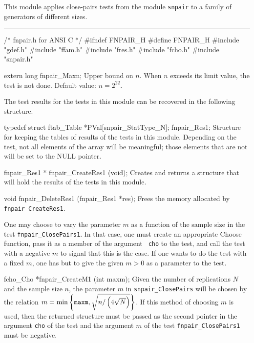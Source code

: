 
This module applies close-pairs tests from the module {\tt snpair}
to a family of generators of different sizes.

\bigskip
\hrule
\code\hide
/* fnpair.h  for ANSI C */
#ifndef FNPAIR_H
#define FNPAIR_H
\endhide
#include "gdef.h"
#include "ffam.h"
#include "fres.h"
#include "fcho.h"
#include "snpair.h"


extern long fnpair_Maxn;
\endcode
\tab
  Upper bound on $n$.
  When $n$ exceeds its limit value, the test is not done.
  Default value: $n = 2^{22}$.
\endtab
\ifdetailed  %



The test results for the tests in this module can be recovered
in the following structure.

\code

typedef struct {
   ftab_Table *PVal[snpair_StatType_N];
} fnpair_Res1;
\endcode
 \tab
  Structure for keeping the tables of results of the tests in
  this module. Depending on the test, not all elements of the array
  will be meaningful; those elements that are not will be set to
  the NULL pointer.
 \endtab
\code


fnpair_Res1 * fnpair_CreateRes1 (void);
\endcode
 \tab
  Creates and returns a structure that will hold the results
  of the tests in this module.
 \endtab
\code


void fnpair_DeleteRes1 (fnpair_Res1 *res);
\endcode
 \tab
  Frees the memory allocated by {\tt fnpair\_CreateRes1}.
 \endtab

\fi    %



 One may choose to vary the parameter $m$ as a function of the sample size
in the test {\tt fnpair\_ClosePairs1}. In that case, one must create
 an appropriate Choose function, pass it as a member of the argument {\tt
cho} to the test,  and call the test with a negative $m$ to signal that
this is the case. If one wants to
 do the test with a fixed $m$, one has but to give the given $m> 0$ as a
parameter to the test.

\code


fcho_Cho *fnpair_CreateM1 (int maxm);
\endcode
 \tab
  Given the number of replications $N$  and the sample
  size $n$, the parameter $m$ in {\tt snpair\_Close\-Pairs} will be chosen
  by the relation
   $m = \min\left\{{\tt maxm},\sqrt{{n}/\left(4\sqrt{N}\right)}\right\}$.
  If this method
  of choosing $m$ is used, then  the returned structure must be passed as
  the second pointer in the argument {\tt cho} of the test and the
  argument $m$ of the test  {\tt fnpair\_ClosePairs1} must be negative.
 \endtab
\code


